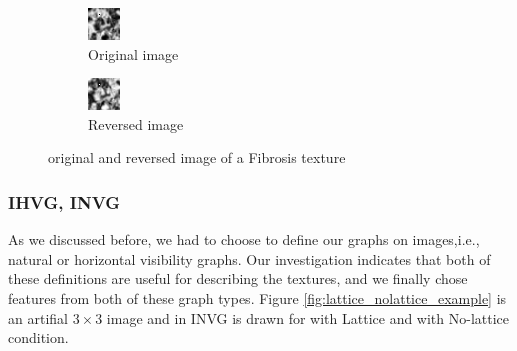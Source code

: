 \documentclass[conference]{IEEEtran}
\begin{document}
\begin{figure}[tbh]
    \centering
    \begin{subfigure}{0.24\textwidth}
        \centering
        \includegraphics[width=0.55\linewidth]{origianl_fibrosis.png}
        \caption{Original image}
        \label{fig:original_texture}
    \end{subfigure}
    \hfill
    \begin{subfigure}{0.24\textwidth}
        \centering
        \includegraphics[width=0.55\linewidth]{reversed_fibrosis.png}
        \caption{Reversed image}
        \label{fig:reversed_texture}
    \end{subfigure}
    \caption{original and reversed image of a Fibrosis texture}
    \label{fig:original_reversed_texture}
\end{figure}



\subsubsection{\textbf{IHVG, INVG}}
As we discussed before, we had to choose to define our graphs on images,i.e., natural or horizontal visibility graphs. Our investigation indicates that both of these definitions are useful for describing the textures, and we finally chose features from both of these graph types.
Figure \ref{fig:lattice_nolattice_example} is an artifial $3\times3$ image and in \cite{china_HVG} INVG is drawn for with Lattice and with No-lattice condition.
\end{document}
